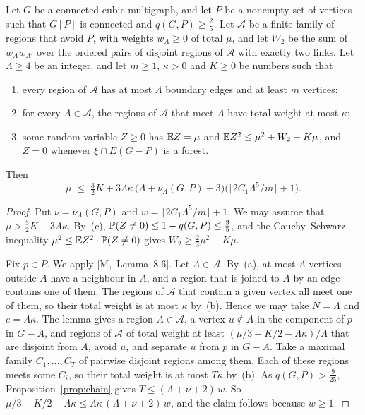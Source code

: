 \documentclass[11pt]{article}
\newcommand{\M}[1]{[M,~#1]}
\begin{document}
\begin{proposition}\label{prop:heavy}
Let $G$ be a connected cubic multigraph, and let $P$ be a nonempty set of vertices such that
$G[P]$ is connected and $q(G,P)\ge\frac25$. Let $\mathcal A$ be a finite family of regions that
avoid $P$, with weights $w_A\ge0$ of total $\mu$, and let $W_2$ be the sum of $w_Aw_{A'}$ over the
ordered pairs of disjoint regions of $\mathcal A$ with exactly two links. Let $\Lambda\ge4$ be an
integer, and let $m\ge1$, $\kappa>0$ and $K\ge0$ be numbers such that
\begin{enumerate}
\item[\textup{(a)}] every region of $\mathcal A$ has at most $\Lambda$ boundary edges and at
least $m$ vertices;
\item[\textup{(b)}] for every $A\in\mathcal A$, the regions of $\mathcal A$ that meet $A$ have
total weight at most $\kappa$;
\item[\textup{(c)}] some random variable $Z\ge0$ has $\mathbb{E} Z=\mu$ and
$\mathbb{E} Z^{2}\le\mu^{2}+W_2+K\mu$, and $Z=0$ whenever $\xi\cap E(G-P)$ is a forest.
\end{enumerate}
Then
\begin{equation}\label{eq:heavy}
  \mu\;\le\;\tfrac32K+3\Lambda\kappa\,\bigl(\Lambda+\nu_\Lambda(G,P)+3\bigr)
  \bigl(\lceil2C_1\Lambda^{5}/m\rceil+1\bigr).
\end{equation}
\end{proposition}

\begin{proof}
Put $\nu=\nu_\Lambda(G,P)$ and $w=\lceil2C_1\Lambda^{5}/m\rceil+1$. We may assume that
$\mu>\frac32K+3\Lambda\kappa$. By~(c), $\mathbb{P}(Z\ne0)\le1-q(G,P)\le\frac35$, and the Cauchy--Schwarz
inequality $\mu^{2}\le\mathbb{E} Z^{2}\cdot\mathbb{P}(Z\ne0)$ gives $W_2\ge\frac23\mu^{2}-K\mu$.

Fix $p\in P$. We apply \M{Lemma~8.6}. Let $A\in\mathcal A$. By~(a), at most $\Lambda$ vertices
outside $A$ have a neighbour in $A$, and a region that is joined to $A$ by an edge contains one of
them. The regions of $\mathcal A$ that contain a given vertex all meet one of them, so their total
weight is at most $\kappa$ by~(b). Hence we may take $N=\Lambda$ and $e=\Lambda\kappa$. The lemma
gives a region $A\in\mathcal A$, a vertex $u\notin A$ in the component of $p$ in $G-A$, and
regions of $\mathcal A$ of total weight at least $(\mu/3-K/2-\Lambda\kappa)/\Lambda$ that are
disjoint from $A$, avoid $u$, and separate $u$ from $p$ in $G-A$. Take a maximal family
$C_1,\dots,C_T$ of pairwise disjoint regions among them. Each of these regions meets some $C_i$,
so their total weight is at most $T\kappa$ by~(b). As $q(G,P)>\frac9{25}$,
Proposition~\ref{prop:chain} gives $T\le(\Lambda+\nu+2)\,w$. So
$\mu/3-K/2-\Lambda\kappa\le\Lambda\kappa\,(\Lambda+\nu+2)\,w$, and the claim follows because
$w\ge1$.
\end{proof}
\end{document}
